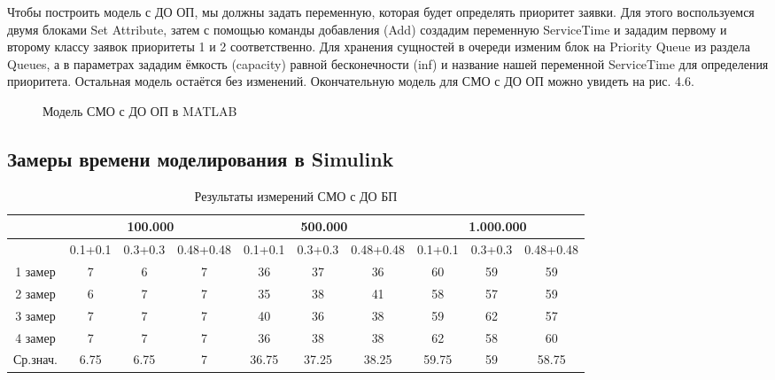 \documentclass[a4paper,14pt]{report} %
\begin{document}
Чтобы построить модель с ДО ОП, мы должны задать переменную, которая будет определять приоритет заявки. Для этого воспользуемся двумя блоками Set Attribute, затем с помощью команды добавления (Add) создадим переменную ServiceTime и зададим первому и второму классу заявок приоритеты 1 и 2 соответственно. Для хранения сущностей в очереди изменим блок на Priority Queue из раздела Queues, а в параметрах зададим ёмкость (capacity) равной бесконечности (inf) и название нашей переменной ServiceTime для определения приоритета. Остальная модель остаётся без изменений. Окончательную модель для СМО с ДО ОП можно увидеть на рис. 4.6.
\begin{figure}[h] %
\caption{Модель СМО с ДО ОП в MATLAB}
\label{ris:matlab_pri}
\end{figure} %

\subsection{Замеры времени моделирования в Simulink}

\begin{table}[h!]
\caption{Результаты измерений СМО с ДО БП}
\begin{tabular}{|c|c|c|c|c|c|c|c|c|c|}
\hline
 & \multicolumn{3}{|c|}{100.000} & \multicolumn{3}{|c|}{500.000} & \multicolumn{3}{|c|}{1.000.000} \\
\hline
 & 0.1+0.1 & 0.3+0.3 & 0.48+0.48 & 0.1+0.1 & 0.3+0.3 & 0.48+0.48 & 0.1+0.1 & 0.3+0.3 & 0.48+0.48 \\
\hline
1 замер &  7 & 6 & 7 & 36 & 37 & 36 & 60 & 59 & 59      \\
\hline
2 замер &  6 & 7 & 7 & 35 & 38 & 41 & 58 & 57 & 59  \\
\hline
3 замер &   7 & 7 & 7 & 40 & 36 & 38 & 59 & 62 & 57  \\
\hline
4 замер &   7 & 7 & 7 & 36 & 38 & 38 & 62 & 58 & 60  \\
\hline
Ср.знач. &   6.75 & 6.75 & 7 & 36.75 & 37.25 & 38.25 & 59.75 & 59 & 58.75   \\
\hline
\end{tabular}
\end{table} 
\end{document}
